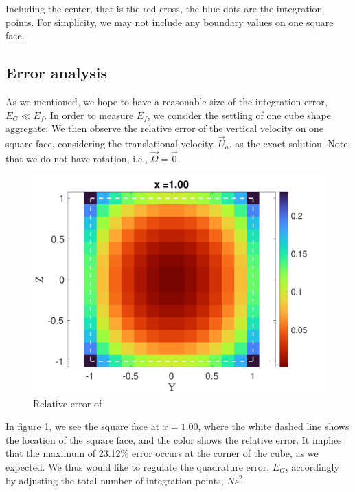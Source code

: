 Including the center, that is the red cross, the blue dots are the integration points.
For simplicity, we may not include any boundary values on one square face.
\subsection{Error analysis}
As we mentioned, we hope to have a reasonable size of the integration error, $E_G \ll E_f$.
In order to measure $E_f$, we consider the settling of one cube shape aggregate.
We then observe the relative error of the vertical velocity on one square face, considering the translational velocity, $\vec{U}_a$, as the exact solution. Note that we do not have rotation, i.e., $\vec{\Omega} = \vec{0}$. 
\begin{figure}[h]
	\begin{center}
		\includegraphics[scale=0.3]{./figures/fig_corner_err}
	\caption{Relative error of }
	\label{fig_corner_err}
\end{center}
\end{figure}
In figure \ref{fig_corner_err}, we see the square face at $x = 1.00$, where the white dashed line shows the location of the square face, and the color shows the relative error. It implies that the maximum of 23.12$\%$ error occurs at the corner of the cube, as we expected. We thus would like to regulate the quadrature error, $E_G$, accordingly by adjusting the total number of integration points, $Ns^2$.
\par
